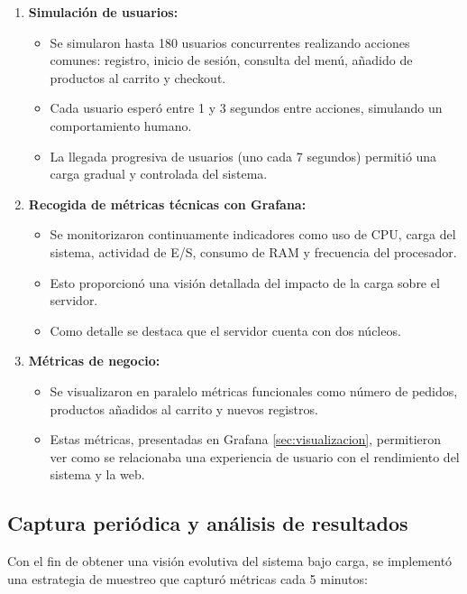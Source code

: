\documentclass[10pt]{book}
\begin{document}
\begin{enumerate}
    \item \textbf{Simulación de usuarios:}
    \begin{itemize}
        \item Se simularon hasta 180 usuarios concurrentes realizando acciones comunes: registro, inicio de sesión, consulta del menú, añadido de productos al carrito y checkout.
        \item Cada usuario esperó entre 1 y 3 segundos entre acciones, simulando un comportamiento humano.
        \item La llegada progresiva de usuarios (uno cada 7 segundos) permitió una carga gradual y controlada del sistema.
    \end{itemize}

    \item \textbf{Recogida de métricas técnicas con Grafana:}
    \begin{itemize}
        \item Se monitorizaron continuamente indicadores como uso de CPU, carga del sistema, actividad de E/S, consumo de RAM y frecuencia del procesador.
        \item Esto proporcionó una visión detallada del impacto de la carga sobre el servidor.
        \item Como detalle se destaca que el servidor cuenta con dos núcleos.
    \end{itemize}

    \item \textbf{Métricas de negocio:}
    \begin{itemize}
        \item Se visualizaron en paralelo métricas funcionales como número de pedidos, productos añadidos al carrito y nuevos registros.
        \item Estas métricas, presentadas en Grafana \autoref{sec:visualizacion}, permitieron ver como se relacionaba una experiencia de usuario con el rendimiento del sistema y la web.
    \end{itemize}
\end{enumerate}

\subsection{Captura periódica y análisis de resultados} \label{sec: locust_err}
Con el fin de obtener una visión evolutiva del sistema bajo carga, se implementó una estrategia de muestreo que capturó métricas cada 5 minutos:
\end{document}
